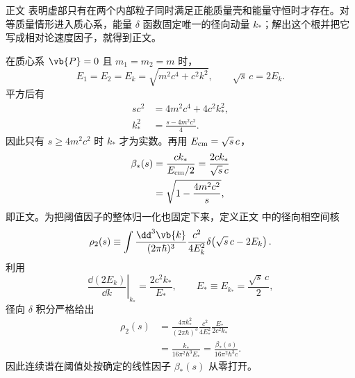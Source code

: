 \begin{derivation}[二体阈值附近的相空间因子]

正文 表明虚部只有在两个内部粒子同时满足正能质量壳和能量守恒时才存在。对等质量情形进入质心系，能量 $\delta$ 函数固定唯一的径向动量 $k_*$；解出这个根并把它写成相对论速度因子，就得到正文。

在质心系 $\vb{P}=0$ 且 $m_1=m_2=m$ 时，
\begin{equation*}
 E_1=E_2=E_k=\sqrt{m^2c^4+c^2k^2},
 \qquad
 \sqrt{s}\,c=2E_k.
\end{equation*}
平方后有
\begin{align*}
 sc^2
 &=4m^2c^4+4c^2k_*^2,\\
 k_*^2
 &=\frac{s-4m^2c^2}{4}.
\end{align*}
因此只有 $s\ge4m^2c^2$ 时 $k_*$ 才为实数。再用 $E_{\rm cm}=\sqrt{s}\,c$，
\begin{align*}
 \beta_*(s)
 &=\frac{ck_*}{E_{\rm cm}/2}
 =\frac{2ck_*}{\sqrt{s}\,c}\\
 &=\sqrt{1-\frac{4m^2c^2}{s}},
\end{align*}
即正文。为把阈值因子的整体归一化也固定下来，定义正文 中的径向相空间核
\begin{equation*}
 \rho_2(s)
 \equiv
 \int\frac{\dd^3\vb{k}}{(2\pi\hbar)^3}
 \frac{c^2}{4E_k^2}
 \delta\!\left(\sqrt{s}\,c-2E_k\right).
\end{equation*}
利用
\begin{equation*}
 \left.\frac{\dd(2E_k)}{\dd k}\right|_{k_*}
 =\frac{2c^2k_*}{E_*},
 \qquad E_*\equiv E_{k_*}=\frac{\sqrt{s}\,c}{2},
\end{equation*}
径向 $\delta$ 积分严格给出
\begin{align*}
 \rho_2(s)
 &=\frac{4\pi k_*^2}{(2\pi\hbar)^3}
 \frac{c^2}{4E_*^2}
 \frac{E_*}{2c^2k_*}\\
 &=\frac{k_*}{16\pi^2\hbar^3E_*}
 =\frac{\beta_*(s)}{16\pi^2\hbar^3c}.
\end{align*}
因此连续谱在阈值处按确定的线性因子 $\beta_*(s)$ 从零打开。
\end{derivation}
